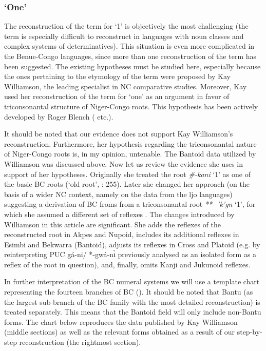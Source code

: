 \subsubsection{‘One’}\label{sec:3.1.4.1}
The reconstruction of the term for ‘1’ is objectively the most challenging (the term is especially difficult to reconstruct in languages with noun classes and complex systems of determinatives). This situation is even more complicated in the Benue-Congo languages, since more than one reconstruction of the term has been suggested. The existing hypotheses must be studied here, especially because the ones pertaining to the etymology of the term were proposed by Kay Williamson, the leading specialist in NC comparative studies. Moreover, Kay \citet{Williamson1989b} used her reconstruction of the term for ‘one’ as an argument in favor of triconsonantal structure of Niger-Congo roots. This hypothesis has been actively developed by Roger Blench (\citeyear*{Blench2012a} etc.). 

It should be noted that our evidence does not support Kay Williamson’s reconstruction. Furthermore, her hypothesis regarding the triconsonantal nature of Niger-Congo roots is, in my opinion, untenable. The Bantoid data utilized by Williamson was discussed above. Now let us review the evidence she uses in support of her hypotheses. Originally she treated the root \textit{\#-kani} ‘1’ as one of the basic BC roots (‘old root’, \citealt{Williamson1989b}: 255). Later she changed her approach (on the basis of a wider NC context, namely on the data from the ljo languages) suggesting a derivation of BC froms from a triconsonantal root \textit{**- 'k{}'g{}n{}} ‘1’, for which she assumed a different set of reflexes \citep[396]{Williamson1992}. The changes introduced by Williamson in this article are significant. She adds the reflexes of the reconstructed root in Akpes and Nupoid, includes its additional reflexes in Esimbi and Bekwarra (Bantoid), adjusts its reflexes in Cross and Platoid (e.g. by reinterpreting PUC gá-ni/ *-gwá-n{\`{ɩ}} previously analysed as an isolated form as a reflex of the root in question), and, finally, omits Kanji and Jukunoid reflexes.

In further interpretation of the BC numeral systems we will use a template chart representing the fourteen branches of BC (). It should be noted that Bantu (as the largest sub-branch of the BC family with the most detailed reconstruction) is treated separately. This means that the Bantoid field will only include non-Bantu forms. The chart below reproduces the data published by Kay Williamson (middle sections) as well as the relevant forms obtained as a result of our step-by-step reconstruction (the rightmost section).

